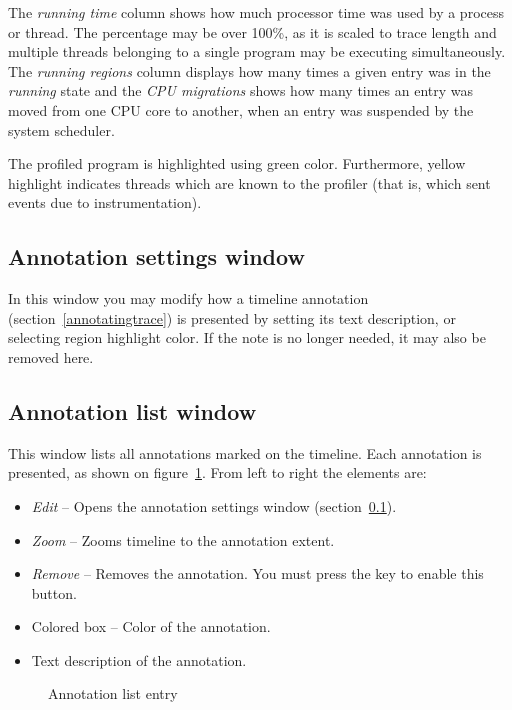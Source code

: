 \documentclass[hidelinks,titlepage,a4paper]{article}
\begin{document}
The \emph{running time} column shows how much processor time was used by a process or thread. The percentage may be over 100\%, as it is scaled to trace length and multiple threads belonging to a single program may be executing simultaneously. The \emph{running regions} column displays how many times a given entry was in the \emph{running} state and the \emph{CPU migrations} shows how many times an entry was moved from one CPU core to another, when an entry was suspended by the system scheduler.

The profiled program is highlighted using green color. Furthermore, yellow highlight indicates threads which are known to the profiler (that is, which sent events due to instrumentation).

\subsection{Annotation settings window}
\label{annotationsettings}

In this window you may modify how a timeline annotation (section~\ref{annotatingtrace}) is presented by setting its text description, or selecting region highlight color. If the note is no longer needed, it may also be removed here.

\subsection{Annotation list window}
\label{annotationlist}

This window lists all annotations marked on the timeline. Each annotation is presented, as shown on figure~\ref{figannlist}. From left to right the elements are:

\begin{itemize}
\item \emph{\faEdit{} Edit} -- Opens the annotation settings window (section~\ref{annotationsettings}).
\item \emph{\faMicroscope{} Zoom} -- Zooms timeline to the annotation extent.
\item \emph{\faTrash*{} Remove} -- Removes the annotation. You must press the \keys{\ctrl} key to enable this button.
\item Colored box -- Color of the annotation.
\item Text description of the annotation.
\end{itemize}

\begin{figure}[h]
\centering{}
\caption{Annotation list entry}
\label{figannlist}
\end{figure}
\end{document}
